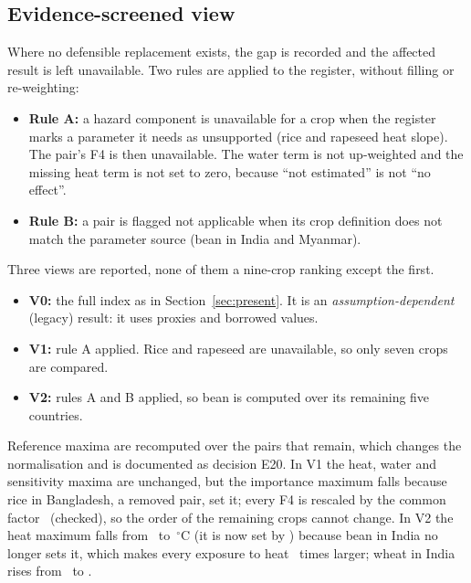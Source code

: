 \subsection{Evidence-screened view}
Where no defensible replacement exists, the gap is recorded and the affected result is left unavailable. Two rules
are applied to the register, without filling or re-weighting:
\begin{itemize}
\item \textbf{Rule A:} a hazard component is unavailable for a crop when the register marks a parameter it needs as
unsupported (rice and rapeseed heat slope). The pair's F4 is then unavailable. The water term is not up-weighted
and the missing heat term is not set to zero, because ``not estimated'' is not ``no effect''.
\item \textbf{Rule B:} a pair is flagged not applicable when its crop definition does not match the parameter source
(bean in India and Myanmar).
\end{itemize}
Three views are reported, none of them a nine-crop ranking except the first.
\begin{itemize}
\item \textbf{V0:} the full index as in Section~\ref{sec:present}. It is an \emph{assumption-dependent} (legacy)
result: it uses proxies and borrowed values.
\item \textbf{V1:} rule A applied. Rice and rapeseed are unavailable, so only seven crops are compared.
\item \textbf{V2:} rules A and B applied, so bean is computed over its remaining five countries.
\end{itemize}
Reference maxima are recomputed over the pairs that remain, which changes the normalisation and is documented as
decision E20. In V1 the heat, water and sensitivity maxima are unchanged, but the importance maximum falls because
rice in Bangladesh, a removed pair, set it; every F4 is rescaled by the common factor \scrRescale\ (checked), so the
order of the remaining crops cannot change. In V2 the heat maximum falls from \scrVZeroHeatMax\ to
\scrVTwoHeatMax\,$^\circ$C (it is now set by \scrVTwoHeatPair) because bean in India no longer sets it, which makes
every exposure to heat \scrHeatRatio\ times larger; wheat in India rises from \scrWheatIndVzero\ to
\scrWheatIndVtwo.

\begin{table}[H]\centering\scriptsize
\caption[Evidence-screened F4]{Crop scores (rank in brackets among the crops with a score) in the full index (V0),
without rice and rapeseed (V1), and also without bean in India and Myanmar (V2). Equal-weighted and
production-weighted. ``Unavailable'' is not ``lowest''. Last column: pairs with a score in V2 out of all modelled
pairs of the crop.}\label{tab:screened}
\end{table}

